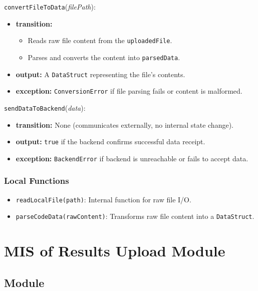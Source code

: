 \documentclass[12pt, titlepage]{article}
\begin{document}
\noindent \texttt{convertFileToData}(\textit{filePath}):
\begin{itemize}
    \item \textbf{transition:}
    \begin{itemize}
        \item Reads raw file content from the \texttt{uploadedFile}.
        \item Parses and converts the content into \texttt{parsedData}.
    \end{itemize}
    \item \textbf{output:} A \texttt{DataStruct} representing the file's contents.
    \item \textbf{exception:} \texttt{ConversionError} if file parsing fails or content is malformed.
\end{itemize}

\noindent \texttt{sendDataToBackend}(\textit{data}):
\begin{itemize}
    \item \textbf{transition:} None (communicates externally, no internal state change).
    \item \textbf{output:} \texttt{true} if the backend confirms successful data receipt.
    \item \textbf{exception:} \texttt{BackendError} if backend is unreachable or fails to accept data.
\end{itemize}

\subsubsection{Local Functions}

\begin{itemize}
    \item \texttt{readLocalFile(path)}: Internal function for raw file I/O.
    \item \texttt{parseCodeData(rawContent)}: Transforms raw file content into a \texttt{DataStruct}.
\end{itemize}

\section{MIS of Results Upload Module} \label{mResultsUpload}

\subsection{Module}
\end{document}

